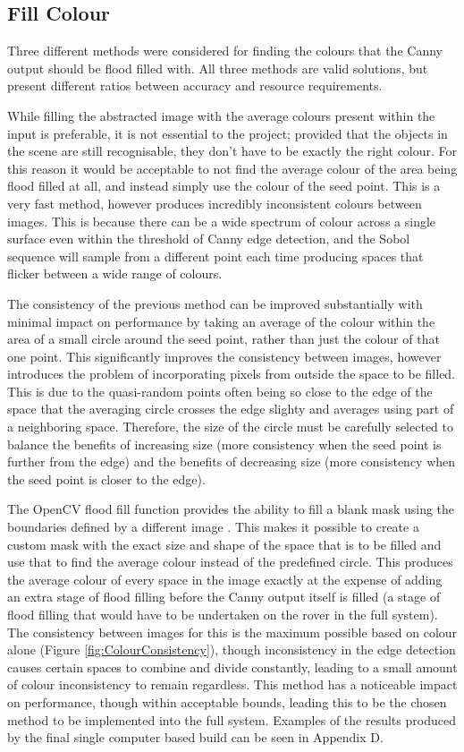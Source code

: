 \subsection{Fill Colour}

Three different methods were considered for finding the colours that the Canny output should be flood filled with. All three methods are valid solutions, but present different ratios between accuracy and resource requirements.

While filling the abstracted image with the average colours present within the input is preferable, it is not essential to the project; provided that the objects in the scene are still recognisable, they don't have to be exactly the right colour. For this reason it would be acceptable to not find the average colour of the area being flood filled at all, and instead simply use the colour of the seed point. This is a very fast method, however produces incredibly inconsistent colours between images. This is because there can be a wide spectrum of colour across a single surface even within the threshold of Canny edge detection, and the Sobol sequence will sample from a different point each time producing spaces that flicker between a wide range of colours.

The consistency of the previous method can be improved substantially with minimal impact on performance by taking an average of the colour within the area of a small circle around the seed point, rather than just the colour of that one point. This significantly improves the consistency between images, however introduces the problem of incorporating pixels from outside the space to be filled. This is due to the quasi-random points often being so close to the edge of the space that the averaging circle crosses the edge slighty and averages using part of a neighboring space. Therefore, the size of the circle must be carefully selected to balance the benefits of increasing size (more consistency when the seed point is further from the edge) and the benefits of decreasing size (more consistency when the seed point is closer to the edge). 

The OpenCV flood fill function provides the ability to fill a blank mask using the boundaries defined by a different image \cite{bradski2008learning}. This makes it possible to create a custom mask with the exact size and shape of the space that is to be filled and use that to find the average colour instead of the predefined circle. This produces the average colour of every space in the image exactly at the expense of adding an extra stage of flood filling before the Canny output itself is filled (a stage of flood filling that would have to be undertaken on the rover in the full system). The consistency between images for this is the maximum possible based on colour alone (Figure \ref{fig:ColourConsistency}), though inconsistency in the edge detection causes certain spaces to combine and divide constantly, leading to a small amount of colour inconsistency to remain regardless. This method has a noticeable impact on performance, though within acceptable bounds, leading this to be the chosen method to be implemented into the full system. Examples of the results produced by the final single computer based build can be seen in Appendix D.

